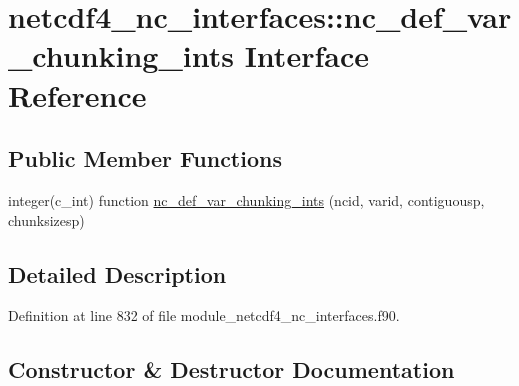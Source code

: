 \hypertarget{interfacenetcdf4__nc__interfaces_1_1nc__def__var__chunking__ints}{}\section{netcdf4\+\_\+nc\+\_\+interfaces\+:\+:nc\+\_\+def\+\_\+var\+\_\+chunking\+\_\+ints Interface Reference}
\label{interfacenetcdf4__nc__interfaces_1_1nc__def__var__chunking__ints}
\subsection*{Public Member Functions}
\begin{DoxyCompactItemize}
\item 
integer(c\+\_\+int) function \hyperlink{interfacenetcdf4__nc__interfaces_1_1nc__def__var__chunking__ints_a8e0b17696e7bc145e803f6607dca0568}{nc\+\_\+def\+\_\+var\+\_\+chunking\+\_\+ints} (ncid, varid, contiguousp, chunksizesp)
\end{DoxyCompactItemize}


\subsection{Detailed Description}


Definition at line 832 of file module\+\_\+netcdf4\+\_\+nc\+\_\+interfaces.\+f90.



\subsection{Constructor \& Destructor Documentation}
\mbox{\label{interfacenetcdf4__nc__interfaces_1_1nc__def__var__chunking__ints_a8e0b17696e7bc145e803f6607dca0568}} 
